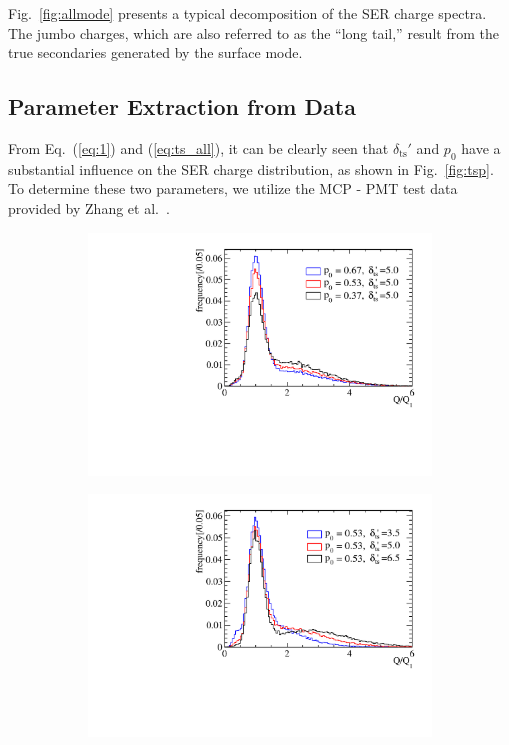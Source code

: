 Fig.~\ref{fig:allmode} presents a typical decomposition of the SER charge spectra. The jumbo charges, which are also referred to as the “long tail,” result from the true secondaries generated by the surface mode.

\subsection{Parameter Extraction from Data}\label{subsec:chitest}
From Eq.~(\ref{eq:1}) and (\ref{eq:ts_all}), it can be clearly seen that $\delta_{\mathrm{ts}}'$ and \(p_0\) have a substantial influence on the SER charge distribution, as shown in Fig.~\ref{fig:tsp}. To determine these two parameters, we utilize the MCP - PMT test data provided by Zhang et al.~\cite{Zhang:2023ued}.
\begin{figure}[!htbp]
	\centering
	\begin{subfigure}{0.5\textwidth}
		\centering
		\includegraphics[width=0.95\linewidth]{PMTRelated/GTmodel/p.pdf}
		\caption{}
		\label{fig:p}
	\end{subfigure}%
	\hfill
	\begin{subfigure}{0.5\textwidth}
		\centering
		\includegraphics[width=0.95\linewidth]{PMTRelated/GTmodel/ts.pdf}

\end{subfigure}
\end{figure}

